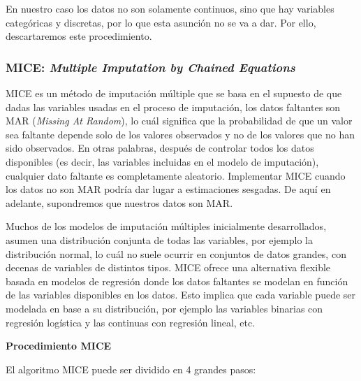 \documentclass[
  11pt,
  a4paper,
]{article}
\begin{document}
En nuestro caso los datos no son solamente continuos, sino que hay
variables categóricas y discretas, por lo que esta asunción no se va a
dar. Por ello, descartaremos este procedimiento.

\subsubsection{MICE: \emph{Multiple Imputation by Chained Equations}}

MICE es un método de imputación múltiple que se basa en el supuesto de
que dadas las variables usadas en el proceso de imputación, los datos
faltantes son MAR (\emph{Missing At Random}), lo cuál significa que la
probabilidad de que un valor sea faltante depende solo de los valores
observados y no de los valores que no han sido observados. En otras
palabras, después de controlar todos los datos disponibles (es decir,
las variables incluidas en el modelo de imputación), cualquier dato
faltante es completamente aleatorio. Implementar MICE cuando los datos
no son MAR podría dar lugar a estimaciones sesgadas. De aquí en
adelante, supondremos que nuestros datos son MAR.

Muchos de los modelos de imputación múltiples inicialmente
desarrollados, asumen una distribución conjunta de todas las variables,
por ejemplo la distribución normal, lo cuál no suele ocurrir en
conjuntos de datos grandes, con decenas de variables de distintos tipos.
MICE ofrece una alternativa flexible basada en modelos de regresión
donde los datos faltantes se modelan en función de las variables
disponibles en los datos. Esto implica que cada variable puede ser
modelada en base a su distribución, por ejemplo las variables binarias
con regresión logística y las continuas con regresión lineal, etc.

\textbf{Procedimiento MICE}

El algoritmo MICE puede ser dividido en 4 grandes pasos:
\end{document}
